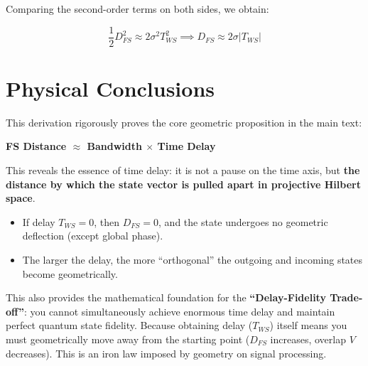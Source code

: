 Comparing the second-order terms on both sides, we obtain:

\[\frac{1}{2} D_{FS}^2 \approx 2\sigma^2 T_{WS}^2 \implies D_{FS} \approx 2\sigma |T_{WS}|\]

\section{Physical Conclusions}

This derivation rigorously proves the core geometric proposition in the main text:

\textbf{FS Distance $\approx$ Bandwidth $\times$ Time Delay}

This reveals the essence of time delay: it is not a pause on the time axis, but \textbf{the distance by which the state vector is pulled apart in projective Hilbert space}.

\begin{itemize}
\item If delay $T_{WS} = 0$, then $D_{FS} = 0$, and the state undergoes no geometric deflection (except global phase).

\item The larger the delay, the more ``orthogonal'' the outgoing and incoming states become geometrically.
\end{itemize}

This also provides the mathematical foundation for the \textbf{``Delay-Fidelity Trade-off''}: you cannot simultaneously achieve enormous time delay and maintain perfect quantum state fidelity. Because obtaining delay ($T_{WS}$) itself means you must geometrically move away from the starting point ($D_{FS}$ increases, overlap $V$ decreases). This is an iron law imposed by geometry on signal processing.

